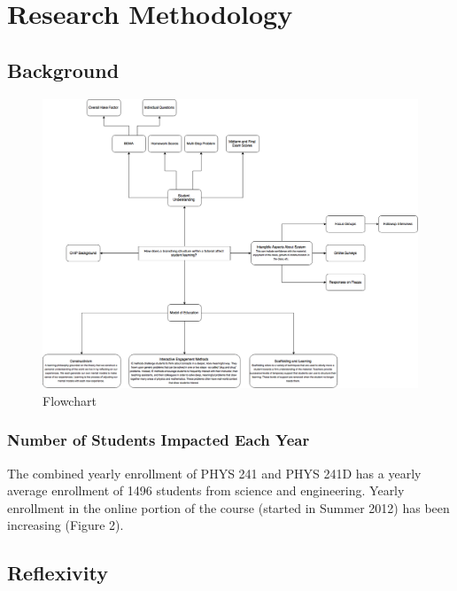 \chapter[Chapter 3: Research Methodology]{Research Methodology}

\section{Background}

\begin{figure}[hb]
	\centering
	\includegraphics[width=6in]{img/chapter3/flowchart}
	\caption[Flowchart]{Flowchart}
\end{figure}

\subsection{Number of Students Impacted Each Year}

The combined yearly enrollment of PHYS
241 and PHYS 241D has a yearly average
enrollment of 1496 students from science and
engineering. Yearly enrollment in the online
portion of the course (started in Summer 2012)
has been increasing (Figure 2).

\section{Reflexivity}

